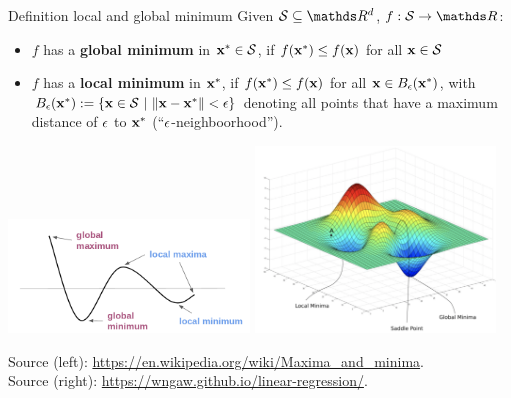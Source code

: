 \begin{vbframe}{Definition local and global minimum}
  Given $\mathcal{S} \subseteq \R^d$, $f: \mathcal{S} \to \R$:
  \begin{itemize}
  \item $f$ has a \textbf{global minimum} in $\mathbf{x}^\ast \in \mathcal{S}$, if $f(\mathbf{x}^\ast) \leq f(\mathbf{x})$ for all $\mathbf{x} \in \mathcal{S}$
  \item $f$ has a \textbf{local minimum} in $\mathbf{x}^\ast$, if $f(\mathbf{x}^\ast) \leq f(\mathbf{x})$ for all $\mathbf{x} \in B_\epsilon(\mathbf{x}^\ast)$, with $B_\epsilon(\mathbf{x}^\ast) := \{\mathbf{x} \in \mathcal{S} ~|~\|\mathbf{x} - \mathbf{x}^\ast\| < \epsilon\}$ denoting all points that have a maximum distance of $\epsilon$ to $\mathbf{x}^\ast$ (\enquote{$\epsilon$-neighboorhood}).  
  \end{itemize}
  
  \vspace*{-0.3cm}
  
  \begin{center}
  \includegraphics[width = 0.48\textwidth]{figure_man/local_global_min.png} \quad \includegraphics[width = 0.48\textwidth]{figure_man/local_global_min_2D.png} \\
  \vspace*{0.3cm}
  \begin{tiny}
    Source (left): \url{https://en.wikipedia.org/wiki/Maxima_and_minima}. \\ Source (right): \url{https://wngaw.github.io/linear-regression/}. 
  \end{tiny}
  \end{center}
  
  \end{vbframe}
  
